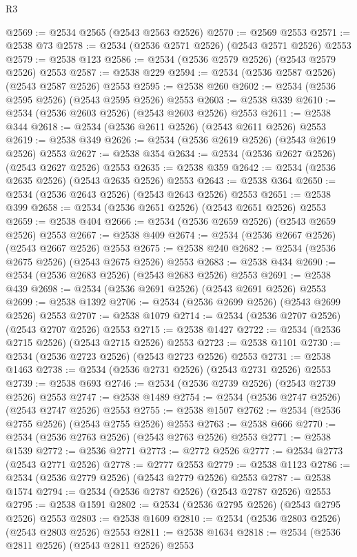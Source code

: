 \begin{lexlean}{R3}
\begin{coremodule}
@2569 := @2534 @2565 (@2543 @2563 @2526)
@2570 := @2569 @2553
@2571 := @2538 @73
@2578 := @2534 (@2536 @2571 @2526) (@2543 @2571 @2526) @2553
@2579 := @2538 @123
@2586 := @2534 (@2536 @2579 @2526) (@2543 @2579 @2526) @2553
@2587 := @2538 @229
@2594 := @2534 (@2536 @2587 @2526) (@2543 @2587 @2526) @2553
@2595 := @2538 @260
@2602 := @2534 (@2536 @2595 @2526) (@2543 @2595 @2526) @2553
@2603 := @2538 @339
@2610 := @2534 (@2536 @2603 @2526) (@2543 @2603 @2526) @2553
@2611 := @2538 @344
@2618 := @2534 (@2536 @2611 @2526) (@2543 @2611 @2526) @2553
@2619 := @2538 @349
@2626 := @2534 (@2536 @2619 @2526) (@2543 @2619 @2526) @2553
@2627 := @2538 @354
@2634 := @2534 (@2536 @2627 @2526) (@2543 @2627 @2526) @2553
@2635 := @2538 @359
@2642 := @2534 (@2536 @2635 @2526) (@2543 @2635 @2526) @2553
@2643 := @2538 @364
@2650 := @2534 (@2536 @2643 @2526) (@2543 @2643 @2526) @2553
@2651 := @2538 @399
@2658 := @2534 (@2536 @2651 @2526) (@2543 @2651 @2526) @2553
@2659 := @2538 @404
@2666 := @2534 (@2536 @2659 @2526) (@2543 @2659 @2526) @2553
@2667 := @2538 @409
@2674 := @2534 (@2536 @2667 @2526) (@2543 @2667 @2526) @2553
@2675 := @2538 @240
@2682 := @2534 (@2536 @2675 @2526) (@2543 @2675 @2526) @2553
@2683 := @2538 @434
@2690 := @2534 (@2536 @2683 @2526) (@2543 @2683 @2526) @2553
@2691 := @2538 @439
@2698 := @2534 (@2536 @2691 @2526) (@2543 @2691 @2526) @2553
@2699 := @2538 @1392
@2706 := @2534 (@2536 @2699 @2526) (@2543 @2699 @2526) @2553
@2707 := @2538 @1079
@2714 := @2534 (@2536 @2707 @2526) (@2543 @2707 @2526) @2553
@2715 := @2538 @1427
@2722 := @2534 (@2536 @2715 @2526) (@2543 @2715 @2526) @2553
@2723 := @2538 @1101
@2730 := @2534 (@2536 @2723 @2526) (@2543 @2723 @2526) @2553
@2731 := @2538 @1463
@2738 := @2534 (@2536 @2731 @2526) (@2543 @2731 @2526) @2553
@2739 := @2538 @693
@2746 := @2534 (@2536 @2739 @2526) (@2543 @2739 @2526) @2553
@2747 := @2538 @1489
@2754 := @2534 (@2536 @2747 @2526) (@2543 @2747 @2526) @2553
@2755 := @2538 @1507
@2762 := @2534 (@2536 @2755 @2526) (@2543 @2755 @2526) @2553
@2763 := @2538 @666
@2770 := @2534 (@2536 @2763 @2526) (@2543 @2763 @2526) @2553
@2771 := @2538 @1539
@2772 := @2536 @2771
@2773 := @2772 @2526
@2777 := @2534 @2773 (@2543 @2771 @2526)
@2778 := @2777 @2553
@2779 := @2538 @1123
@2786 := @2534 (@2536 @2779 @2526) (@2543 @2779 @2526) @2553
@2787 := @2538 @1574
@2794 := @2534 (@2536 @2787 @2526) (@2543 @2787 @2526) @2553
@2795 := @2538 @1591
@2802 := @2534 (@2536 @2795 @2526) (@2543 @2795 @2526) @2553
@2803 := @2538 @1609
@2810 := @2534 (@2536 @2803 @2526) (@2543 @2803 @2526) @2553
@2811 := @2538 @1634
@2818 := @2534 (@2536 @2811 @2526) (@2543 @2811 @2526) @2553

\end{coremodule}
\end{lexlean}
